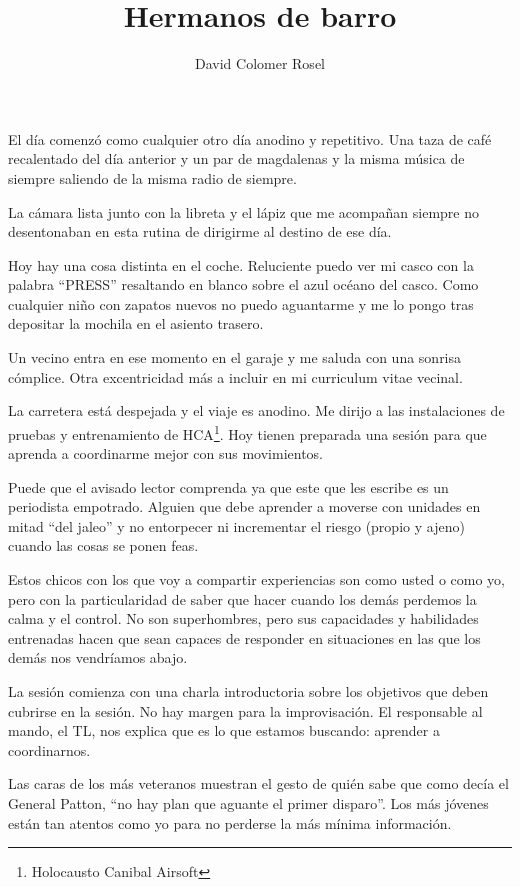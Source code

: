 \documentclass[10pt,a4paper,twoside,twocolumn,final]{article}
\author{David Colomer Rosel}
\title{Hermanos de barro}
\begin{document}
	\maketitle
	
	El d\'ia comenz\'o como cualquier otro d\'ia anodino y repetitivo. Una taza de caf\'e recalentado del d\'ia anterior y un par de magdalenas y la misma m\'usica de siempre saliendo de la misma radio de siempre.
	
	La c\'amara lista junto con la libreta y el l\'apiz que me acompa\~{n}an siempre no desentonaban en esta rutina de dirigirme al destino de ese d\'ia. 
	
	Hoy hay una cosa distinta en el coche. Reluciente puedo ver mi casco con la palabra ``PRESS'' resaltando en blanco sobre el azul oc\'eano del casco. Como cualquier ni\~{n}o con zapatos nuevos no puedo aguantarme y me lo pongo tras depositar la mochila en el asiento trasero. 
	
	Un vecino entra en ese momento en el garaje y me saluda con una sonrisa c\'omplice. Otra excentricidad m\'as a incluir en mi curriculum vitae vecinal.
	
	La carretera est\'a despejada y el viaje es anodino. Me dirijo a las instalaciones de pruebas y entrenamiento de HCA\footnote{Holocausto Canibal Airsoft}. Hoy tienen preparada una sesi\'on para que aprenda a coordinarme mejor con sus movimientos.
	
	
	
	Puede que el avisado lector comprenda ya que este que les escribe es un periodista empotrado. Alguien que debe aprender a moverse con unidades en mitad ``del jaleo'' y no entorpecer ni incrementar el riesgo (propio y ajeno) cuando las cosas se ponen feas.
	
	
	
	Estos chicos con los que voy a compartir experiencias son como usted o como yo, pero con la particularidad de saber que hacer cuando los dem\'as perdemos la calma y el control. No son superhombres, pero sus capacidades y habilidades entrenadas hacen que sean capaces de responder en situaciones en las que los dem\'as nos vendr\'iamos abajo.
	
	La sesi\'on comienza con una charla introductoria sobre los objetivos que deben cubrirse en la sesi\'on. No hay margen para la improvisaci\'on. El responsable al mando, el TL, nos explica que es lo que estamos buscando: aprender a coordinarnos.
	
	Las caras de los m\'as veteranos muestran el gesto de qui\'en sabe que como dec\'ia el General Patton, ``no hay plan que aguante el primer disparo''. Los m\'as j\'ovenes est\'an tan atentos como yo para no perderse la m\'as m\'inima informaci\'on.
	
\end{document}
